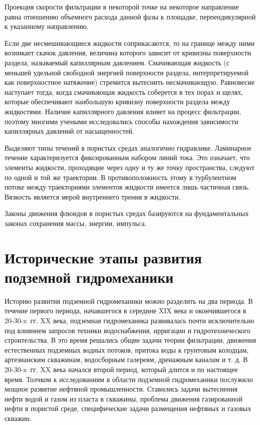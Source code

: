 Проекция скорости фильтрации в некоторой точке на некоторое направление равна отношению объемного расхода данной фазы к площадке, перпендикулярной к указанному направлению.

Если две несмешивающиеся жидкости соприкасаются, то на границе между ними возникает скачок давления, величина которого зависит от кривизны поверхности раздела, называемый капиллярным давлением.
Смачивающая жидкость (с меньшей удельной свободной энергией поверхности раздела, интерпретируемой как поверхностное натяжение) стремится вытеснить несмачивающую. Равновесие наступает тогда, когда смачивающая жидкость 
соберется в тех порах и щелях, которые обеспечивают наибольшую кривизну поверхности раздела между жидкостями. Наличие капиллярного давления влияет на процесс фильтрации, поэтому многими учеными исследовались
способы нахождения зависимости капиллярных давлений от насыщенностей.

Выделяют типы течений в пористых средах аналогично гидравлике. Ламинарное течение характеризуется фиксированным набором линий тока. Это означает, что элементы жидкости, проходящие через одну и ту же точку пространства,
следуют по одной и той же траектории. В противоположность этому в турбулентном потоке между траекториями элементов жидкости имеется лишь частичная связь. Вязкость является мерой внутреннего трения в жидкости.

Законы движения флюидов в пористых средах базируются на фундаментальных законах сохранения массы, энергии, импульса.

\newpage

\section{Исторические этапы развития подземной гидромеханики}

Историю развития подземной гидромеханики можно разделить на два периода. В течение первого периода, начавшегося в середине XIX века и окончившегося в 20-30-x~гг. XX века,
подземная гидромеханика развивалась почти исключительно под влиянием запросов техники водоснабжения, ирригации и гидротехнического строительства.
В это время решались общие задачи теории фильтрации, движения естественных подземных водных потоков, притока воды к грунтовым колодцам, артезианским скважинам, водосборным галереям, дренажным каналам и т. д.
В 20-30-x~гг. XX века начался второй период, который длится и по настоящее время. Толчком к исследованиям в области подземной гидромеханики послужило мощное развитие нефтяной промышленности.
Ставились задачи вытеснения нефти водой и газом из пласта в скважины, проблема движения газированной нефти в пористой среде, специфические задачи размещения нефтяных и газовых скважин.

